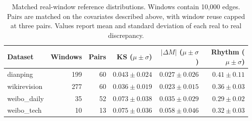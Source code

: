 \begin{table}[h]
\caption{Matched real-window reference distributions. Windows contain 10,000 edges. Pairs are matched on the covariates described above, with window reuse capped at three pairs. Values report mean and standard deviation of each real to real discrepancy.}
\label{tab:rr-reference}
\centering\small
\begin{tabular}{lrrrrr}
\toprule
Dataset & Windows & Pairs & KS ($\mu\pm\sigma$) & $|\Delta M|$ ($\mu\pm\sigma$) & Rhythm ($\mu\pm\sigma$) \\
\midrule
dianping & 199 & 60 & $0.043\pm0.024$ & $0.027\pm0.026$ & $0.41\pm0.11$ \\
wikirevision & 277 & 60 & $0.036\pm0.019$ & $0.023\pm0.015$ & $0.36\pm0.03$ \\
weibo\_daily & 35 & 52 & $0.073\pm0.038$ & $0.035\pm0.029$ & $0.29\pm0.02$ \\
weibo\_tech & 10 & 13 & $0.075\pm0.036$ & $0.058\pm0.046$ & $0.32\pm0.03$ \\
\bottomrule
\end{tabular}
\end{table}
